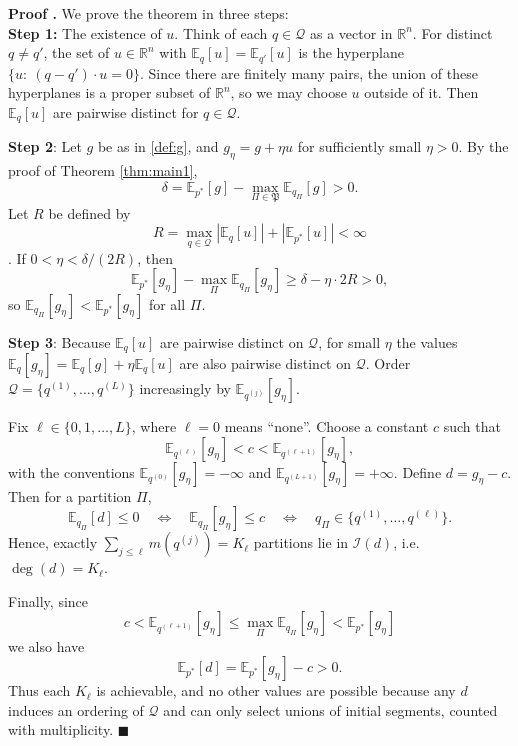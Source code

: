 \documentclass[10pt, letterpaper]{article}%
\theoremstyle{definition}
\renewenvironment{proof}[1][\unskip]{%
\par
\noindent
\textbf{Proof #1.}
\noindent}
{\hfill$\blacksquare$

\bigskip}
\newcommand{\E}{\mathbb E}
\newcommand{\1}{\mathbf 1}
\begin{document}
\begin{proof} We prove the theorem in three steps:\\
	\textbf{Step 1:} The existence of $u$.
	Think of each $q\in\mathcal Q$ as a vector in $\mathbb R^n$.
	For distinct $q\neq q'$, the set of $u\in\mathbb R^n$ with $\E_q[u]=\E_{q'}[u]$ is the hyperplane
	$\{u:\ (q-q')\cdot u=0\}$. Since there are finitely many pairs, the union of these hyperplanes is a proper subset of $\mathbb R^n$,
	so we may choose $u$ outside of it. Then $\E_q[u]$ are pairwise distinct for $q\in\mathcal Q$.

	\noindent \textbf{Step 2}: Let $g$ be as in \eqref{def:g}, and $g_\eta=g+\eta u$ for sufficiently small $\eta>0$.
	By the proof of Theorem \ref{thm:main1},
	\[
		\delta=\E_{p^*}[g]-\max_{\Pi\in\mathfrak P}\E_{q_\Pi}[g] > 0.
	\]
	Let $R$ be defined by 
    \begin{equation}
    R=\max_{q\in\mathcal Q}|\E_q[u]|+|\E_{p^*}[u]|<\infty
    \end{equation}.
	If $0<\eta<\delta/(2R)$, then
	\[
	\E_{p^*}[g_\eta]-\max_{\Pi}\E_{q_\Pi}[g_\eta]
	\ge \delta-\eta\cdot 2R>0,
	\]
	so $\E_{q_\Pi}[g_\eta]<\E_{p^*}[g_\eta]$ for all $\Pi$.

	\noindent \textbf{Step 3}:
	Because $\E_q[u]$ are pairwise distinct on $\mathcal Q$, for small $\eta$ the values
	$\E_q[g_\eta]=\E_q[g]+\eta\E_q[u]$ are also pairwise distinct on $\mathcal Q$.
	Order $\mathcal Q=\{q^{(1)},\dots,q^{(L)}\}$ increasingly by $\E_{q^{(j)}}[g_\eta]$.
	
	Fix $\ell\in\{0,1,\dots,L\}$, where $\ell=0$ means ``none''.
	Choose a constant $c$ such that
	\[
	\E_{q^{(\ell)}}[g_\eta] < c < \E_{q^{(\ell+1)}}[g_\eta],
	\]
	with the conventions $\E_{q^{(0)}}[g_\eta]=-\infty$ and $\E_{q^{(L+1)}}[g_\eta]=+\infty$.
	Define $d=g_\eta-c$. Then for a partition $\Pi$,
	\[
	\E_{q_\Pi}[d]\le 0
	\quad\Longleftrightarrow\quad
	\E_{q_\Pi}[g_\eta]\le c
	\quad\Longleftrightarrow\quad
	q_\Pi\in\{q^{(1)},\dots,q^{(\ell)}\}.
	\]
	Hence, exactly $\sum_{j\le \ell} m(q^{(j)})=K_\ell$ partitions lie in $\mathcal I(d)$, i.e.\ $\deg(d)=K_\ell$.

	Finally, since 
    \begin{equation}
    c<\E_{q^{(\ell+1)}}[g_\eta]\le \max_{\Pi}\E_{q_\Pi}[g_\eta]<\E_{p^*}[g_\eta]   
    \end{equation} we also have
	\begin{equation}
	 \E_{p^*}[d]=\E_{p^*}[g_\eta]-c>0.   
	\end{equation}
	Thus each $K_\ell$ is achievable, and no other values are possible because any $d$ induces an ordering of $\mathcal Q$
	and can only select unions of initial segments, counted with multiplicity.
\end{proof}
\end{document}
